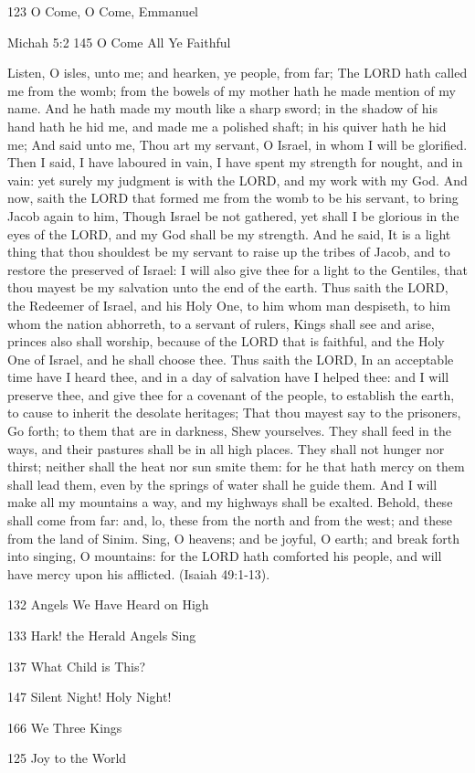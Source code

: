123 O Come, O Come, Emmanuel

Michah 5:2
145 O Come All Ye Faithful


Listen, O isles, unto me; and hearken, ye people, from far; The LORD hath
called me from the womb; from the bowels of my mother hath he made mention
of my name. And he hath made my mouth like a sharp sword; in the shadow
of his hand hath he hid me, and made me a polished shaft; in his quiver
hath he hid me; And said unto me, Thou art my servant, O Israel, in whom
I will be glorified. Then I said, I have laboured in vain, I have spent
my strength for nought, and in vain: yet surely my judgment is with the
LORD, and my work with my God. And now, saith the LORD that formed me from
the womb to be his servant, to bring Jacob again to him, Though Israel
be not gathered, yet shall I be glorious in the eyes of the LORD, and my
God shall be my strength. And he said, It is a light thing that thou shouldest
be my servant to raise up the tribes of Jacob, and to restore the preserved
of Israel: I will also give thee for a light to the Gentiles, that thou
mayest be my salvation unto the end of the earth. Thus saith the LORD,
the Redeemer of Israel, and his Holy One, to him whom man despiseth, to
him whom the nation abhorreth, to a servant of rulers, Kings shall see
and arise, princes also shall worship, because of the LORD that is faithful,
and the Holy One of Israel, and he shall choose thee. Thus saith the LORD,
In an acceptable time have I heard thee, and in a day of salvation have
I helped thee: and I will preserve thee, and give thee for a covenant of
the people, to establish the earth, to cause to inherit the desolate heritages;
That thou mayest say to the prisoners, Go forth; to them that are in darkness,
Shew yourselves. They shall feed in the ways, and their pastures shall
be in all high places. They shall not hunger nor thirst; neither shall
the heat nor sun smite them: for he that hath mercy on them shall lead
them, even by the springs of water shall he guide them. And I will make
all my mountains a way, and my highways shall be exalted. Behold, these
shall come from far: and, lo, these from the north and from the west; and
these from the land of Sinim. Sing, O heavens; and be joyful, O earth;
and break forth into singing, O mountains: for the LORD hath comforted
his people, and will have mercy upon his afflicted. (Isaiah 49:1-13).

132 Angels We Have Heard on High

133 Hark! the Herald Angels Sing

137 What Child is This?

147 Silent Night! Holy Night!

166 We Three Kings

125 Joy to the World

